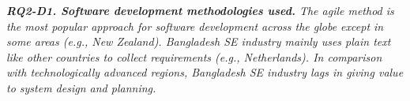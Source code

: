 
\begin{tcolorbox}[flushleft upper,boxrule=1pt,arc=0pt,left=0pt,right=0pt,top=0pt,bottom=0pt,colback=white,after=\ignorespacesafterend\par\noindent]
\nd\it{\bf{RQ2-D1. Software development methodologies used.}}
The agile method is the most popular approach for software development across the globe except in some areas (e.g., New Zealand).
Bangladesh SE industry mainly uses plain text like other countries to collect requirements (e.g., Netherlands).
In comparison with technologically advanced regions, Bangladesh SE industry lags in giving value to system design and planning.
\end{tcolorbox}